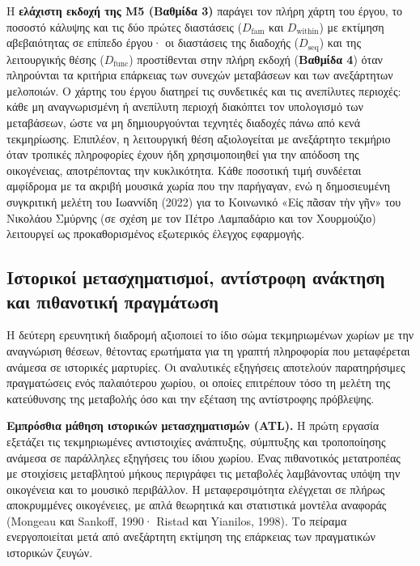 \documentclass[11pt,a4paper]{article}
\begin{document}
Η \textbf{ελάχιστη εκδοχή της Μ5 (Βαθμίδα 3)} παράγει τον πλήρη χάρτη του έργου, το ποσοστό κάλυψης και τις δύο πρώτες διαστάσεις (\(D_{\mathrm{fam}}\) και \(D_{\mathrm{within}}\)) με εκτίμηση αβεβαιότητας σε επίπεδο έργου· οι διαστάσεις της διαδοχής (\(D_{\mathrm{seq}}\)) και της λειτουργικής θέσης (\(D_{\mathrm{func}}\)) προστίθενται στην πλήρη εκδοχή (\textbf{Βαθμίδα 4}) όταν πληρούνται τα κριτήρια επάρκειας των συνεχών μεταβάσεων και των ανεξάρτητων μελοποιών. Ο χάρτης του έργου διατηρεί τις συνδετικές και τις ανεπίλυτες περιοχές: κάθε μη αναγνωρισμένη ή ανεπίλυτη περιοχή διακόπτει τον υπολογισμό των μεταβάσεων, ώστε να μη δημιουργούνται τεχνητές διαδοχές πάνω από κενά τεκμηρίωσης. Επιπλέον, η λειτουργική θέση αξιολογείται με ανεξάρτητο τεκμήριο όταν τροπικές πληροφορίες έχουν ήδη χρησιμοποιηθεί για την απόδοση της οικογένειας, αποτρέποντας την κυκλικότητα. Κάθε ποσοτική τιμή συνδέεται αμφίδρομα με τα ακριβή μουσικά χωρία που την παρήγαγαν, ενώ η δημοσιευμένη συγκριτική μελέτη του Ιωαννίδη (2022) για το Κοινωνικό «Εἰς πᾶσαν τὴν γῆν» του Νικολάου Σμύρνης (σε σχέση με τον Πέτρο Λαμπαδάριο και τον Χουρμούζιο) λειτουργεί ως προκαθορισμένος εξωτερικός έλεγχος εφαρμογής.

\subsection{Ιστορικοί μετασχηματισμοί, αντίστροφη ανάκτηση και πιθανοτική πραγμάτωση}\label{sec:historic-inverse}

Η δεύτερη ερευνητική διαδρομή αξιοποιεί το ίδιο σώμα τεκμηριωμένων χωρίων με την αναγνώριση θέσεων, θέτοντας ερωτήματα για τη γραπτή πληροφορία που μεταφέρεται ανάμεσα σε ιστορικές μαρτυρίες. Οι αναλυτικές εξηγήσεις αποτελούν παρατηρήσιμες πραγματώσεις ενός παλαιότερου χωρίου, οι οποίες επιτρέπουν τόσο τη μελέτη της κατεύθυνσης της μεταβολής όσο και την εξέταση της αντίστροφης πρόβλεψης.

\textbf{Εμπρόσθια μάθηση ιστορικών μετασχηματισμών (ATL).} Η πρώτη εργασία εξετάζει τις τεκμηριωμένες αντιστοιχίες ανάπτυξης, σύμπτυξης και τροποποίησης ανάμεσα σε παράλληλες εξηγήσεις του ίδιου χωρίου. Ένας πιθανοτικός μετατροπέας με στοιχίσεις μεταβλητού μήκους περιγράφει τις μεταβολές λαμβάνοντας υπόψη την οικογένεια και το μουσικό περιβάλλον. Η μεταφερσιμότητα ελέγχεται σε πλήρως αποκρυμμένες οικογένειες, με απλά θεωρητικά και στατιστικά μοντέλα αναφοράς (Mongeau και Sankoff, 1990· Ristad και Yianilos, 1998). Το πείραμα ενεργοποιείται μετά από ανεξάρτητη εκτίμηση της επάρκειας των πραγματικών ιστορικών ζευγών.
\end{document}

